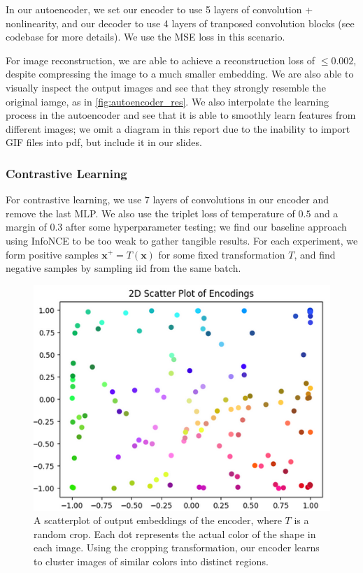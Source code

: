 \documentclass{article}
\begin{document}
In our autoencoder, we set our encoder to use 5 layers of convolution + nonlinearity, and our decoder to use 4 layers of tranposed convolution blocks (see codebase for more details). We use the MSE loss in this scenario.

For image reconstruction, we are able to achieve a reconstruction loss of $\leq 0.002$, despite compressing the image to a much smaller embedding. We are also able to visually inspect the output images and see that they strongly resemble the original iamge, as in \ref{fig:autoencoder_res}. We also interpolate the learning process in the autoencoder and see that it is able to smoothly learn features from different images; we omit a diagram in this report due to the inability to import GIF files into pdf, but include it in our slides.

\subsubsection{Contrastive Learning}

For contrastive learning, we use 7 layers of convolutions in our encoder and remove the last MLP. We also use the triplet loss of temperature of $0.5$ and a margin of $0.3$ after some hyperparameter testing; we find our baseline approach using InfoNCE to be too weak to gather tangible results. For each experiment, we form positive samples $\textbf{x}^+ = T(\textbf{x})$ for some fixed transformation $T$, and find negative samples by sampling iid from the same batch.

\begin{figure}[ht]
\centerline{\includegraphics[scale=0.7]{contrastive_scatter.png}}
\caption{A scatterplot of output embeddings of the encoder, where $T$ is a random crop. Each dot represents the actual color of the shape in each image. Using the cropping transformation, our encoder learns to cluster images of similar colors into distinct regions.}\label{fig:contrastive_scatter}
\end{figure} 
\end{document}
